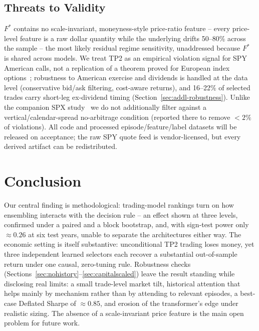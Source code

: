 \documentclass[sigconf,review]{acmart}
\begin{document}
\subsection{Threats to Validity}
\label{sec:limitations}
$F^{\ast}$ contains no scale-invariant, moneyness-style price-ratio feature -- every price-level feature is a raw dollar quantity while the underlying drifts 50--80\% across the sample -- the most likely residual regime sensitivity, unaddressed because $F^{\ast}$ is shared across models. We treat TP2 as an empirical violation signal for SPY American calls, not a replication of a theorem proved for European index options~\cite{glasserman2026tp2theory,cosma2020earlyexercise}; robustness to American exercise and dividends is handled at the data level (conservative bid/ask filtering, cost-aware returns), and 16--22\% of selected trades carry short-leg ex-dividend timing (Section~\ref{sec:addl-robustness}). Unlike the companion SPX study~\cite{glasserman2025tp2} we do not additionally filter against a vertical/calendar-spread no-arbitrage condition (reported there to remove $<2\%$ of violations). All code and processed episode/feature/label datasets will be released on acceptance; the raw SPY quote feed is vendor-licensed, but every derived artifact can be redistributed.

\section{Conclusion}
Our central finding is methodological: trading-model rankings turn on how ensembling interacts with the decision rule -- an effect shown at three levels, confirmed under a paired and a block bootstrap, and, with sign-test power only $\approx0.26$ at six test years, unable to separate the architectures either way. The economic setting is itself substantive: unconditional TP2 trading loses money, yet three independent learned selectors each recover a substantial out-of-sample return under one causal, zero-tuning rule. Robustness checks (Sections~\ref{sec:nohistory}--\ref{sec:capitalscaled}) leave the result standing while disclosing real limits: a small trade-level market tilt, historical attention that helps mainly by mechanism rather than by attending to relevant episodes, a best-case Deflated Sharpe of $\approx0.85$, and erosion of the transformer's edge under realistic sizing. The absence of a scale-invariant price feature is the main open problem for future work.
\end{document}

